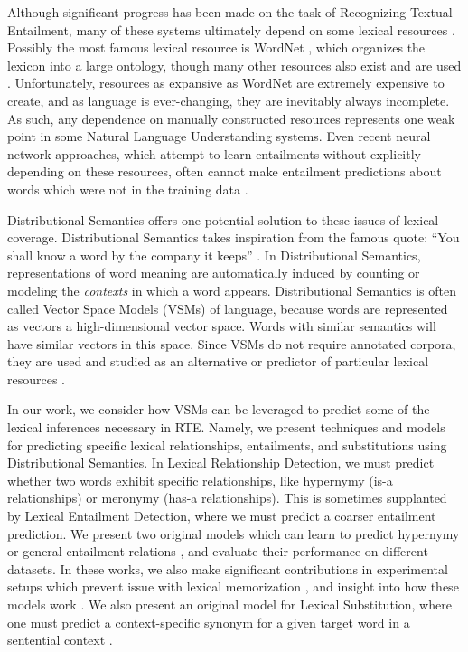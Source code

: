 Although significant progress has been made on the task of Recognizing Textual
Entailment, many of these systems ultimately depend on some lexical resources
\cite{beltagy:2014:semeval,bjerva:2014:semeval,lai:2014:semeval,marelli:2014:semeval,beltagy:2016:cl}.
Possibly the most famous lexical resource is WordNet \cite{miller:1995:acm},
which organizes the lexicon into a large ontology,
though many other resources also exist and are used
\cite{baker:1998:acl,baroni:2011:gems,baroni:2012:eacl,ganitkevitch:2013:naacl,jurgens:2012:semeval,levy:2014:conll,turney:2015:nle}.
Unfortunately, resources as expansive as WordNet are extremely expensive
to create, and as language is ever-changing, they are inevitably
always incomplete. As such, any dependence on manually constructed resources
represents one weak point in some Natural Language Understanding systems. Even
recent neural network approaches, which attempt to learn entailments without
explicitly depending on these resources, often cannot make entailment
predictions about words which were not in the training data
\cite{bowman:2015:emnlp,cheng:2016:arxiv}.

Distributional Semantics offers one potential solution to these issues of lexical
coverage. Distributional Semantics takes inspiration from the famous quote:
``You shall know a word by the company it keeps'' \cite{firth:1957:la}. In
Distributional Semantics, representations of word meaning are automatically
induced by counting or modeling the {\em contexts} in which a word appears.
Distributional Semantics is often called Vector Space Models (VSMs) of
language, because words are represented as vectors a high-dimensional vector space.
Words with similar semantics will have similar vectors in this
space. Since VSMs do not require annotated corpora, they are used and
studied as an alternative or predictor of particular lexical resources
\cite{baroni:2012:eacl,erk:2008:emnlp,turney:2010:jair}.

In our work, we consider how VSMs
can be leveraged to predict some of the lexical inferences necessary in RTE.
Namely, we present techniques and models for predicting specific
lexical relationships, entailments, and substitutions using Distributional
Semantics. In Lexical Relationship Detection, we must
predict whether two words exhibit specific relationships, like hypernymy (is-a
relationships) or meronymy (has-a relationships). This is sometimes supplanted
by Lexical Entailment Detection, where we must predict a coarser entailment
prediction. We present two original models which can learn to predict hypernymy
or general entailment relations
\cite{roller:2014:coling,beltagy:2016:cl,roller:2016:emnlp}, and evaluate their
performance on different datasets. In these works, we also make significant
contributions in experimental setups which prevent issue with lexical
memorization \cite{roller:2014:coling}, and insight into how these models
work \cite{roller:2016:emnlp}.  We also present an original model for Lexical
Substitution, where one must predict a context-specific synonym for a given
target word in a sentential context \cite{roller:2016:naacl}.

